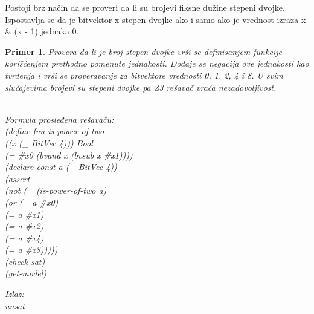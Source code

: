 \documentclass[12pt,oneside]{memoir}
\newtheorem{primer}{Primer}
\begin{document}
Postoji brz način da se proveri da li su brojevi fiksne dužine stepeni dvojke. 
Ispostavlja se da je bitvektor x stepen dvojke ako i samo ako je vrednost izraza
x \& (x - 1) jednaka 0.
\begin{primer} Provera da li je broj stepen dvojke vrši se definisanjem funkcije korišćenjem prethodno pomenute jednakosti. Dodaje se negacija ove jednakosti kao tvrđenja i vrši se proveravanje za bitvektore vrednosti 0, 1, 2, 4 i 8. U svim slučajevima brojevi su stepeni dvojke pa Z3 rešavač vraća nezadovoljivost.\\ \\
\begin{minipage}[b]{0.5\textwidth}
Formula prosleđena rešavaču:
\\(define-fun is-power-of-two 
\\((x (\_ BitVec 4))) Bool 
\\(= \#x0 (bvand x (bvsub x \#x1))))
\\(declare-const a (\_ BitVec 4))
\\(assert 
\\ (not (= (is-power-of-two a) 
\\         (or (= a \#x0) 
\\             (= a \#x1) 
\\             (= a \#x2) 
\\             (= a \#x4) 
\\             (= a \#x8)))))
\\(check-sat)
\\(get-model)
\end{minipage}
\hspace{2.5cm}
\begin{minipage}[t]{0.5\textwidth}
\vspace{-8.35cm}
Izlaz:
\\unsat
\end{minipage}
\end{primer}
\end{document}
